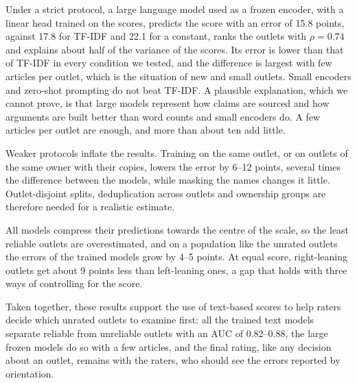 \documentclass[11pt,a4paper]{article}
\begin{document}
Under a strict protocol, a large language model used as a frozen encoder, with a linear head trained on the scores,
predicts the score with an error of 15.8 points, against 17.8 for TF-IDF and 22.1 for a constant, ranks the outlets with
$\rho = 0.74$ and explains about half of the variance of the scores. Its error is lower than that of TF-IDF in every
condition we tested, and the difference is largest with few articles per outlet, which is the situation of new and
small outlets. Small encoders and zero-shot prompting do not beat TF-IDF. A plausible explanation, which we cannot
prove, is that large models represent how claims are sourced and how arguments are built better than word counts and
small encoders do. A few articles per outlet are enough, and more than about ten add little.

Weaker protocols inflate the results. Training on the same outlet, or on outlets of the same owner with their copies,
lowers the error by 6--12 points, several times the difference between the models, while masking the names changes it
little. Outlet-disjoint splits, deduplication across outlets and ownership groups are therefore needed for a realistic
estimate.

All models compress their predictions towards the centre of the scale, so the least reliable outlets are overestimated,
and on a population like the unrated outlets the errors of the trained models grow by 4--5 points. At equal score,
right-leaning outlets get about 9 points less than left-leaning ones, a gap that holds with three ways of controlling for
the score.

Taken together, these results support the use of text-based scores to help raters decide which unrated outlets to
examine first: all the trained text models separate reliable from unreliable outlets with an AUC of 0.82--0.88, the
large frozen models do so with a few articles, and the final rating, like any decision about an outlet, remains with the
raters, who should see the errors reported by orientation.
\end{document}
